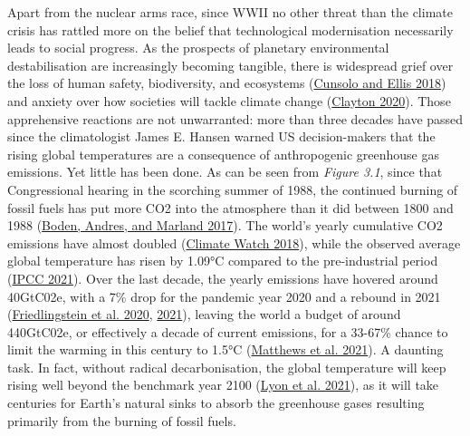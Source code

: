 \documentclass[a4paper, nobind]{templates/ociamthesis}
\begin{document}
Apart from the nuclear arms race, since WWII no other threat than the climate crisis has rattled more on the belief that technological modernisation necessarily leads to social progress. As the prospects of planetary environmental destabilisation are increasingly becoming tangible, there is widespread grief over the loss of human safety, biodiversity, and ecosystems (\protect\hyperlink{ref-cunsolo_ecological_2018}{Cunsolo and Ellis 2018}) and anxiety over how societies will tackle climate change (\protect\hyperlink{ref-clayton_climate_2020}{Clayton 2020}). Those apprehensive reactions are not unwarranted: more than three decades have passed since the climatologist James E. Hansen warned US decision-makers that the rising global temperatures are a consequence of anthropogenic greenhouse gas emissions. Yet little has been done. As can be seen from \emph{Figure 3.1}, since that Congressional hearing in the scorching summer of 1988, the continued burning of fossil fuels has put more CO2 into the atmosphere than it did between 1800 and 1988 (\protect\hyperlink{ref-boden_global_2017}{Boden, Andres, and Marland 2017}). The world's yearly cumulative CO2 emissions have almost doubled (\protect\hyperlink{ref-climate_watch_historical_2018}{Climate Watch 2018}), while the observed average global temperature has risen by 1.09°C compared to the pre-industrial period (\protect\hyperlink{ref-ipcc_summary_2021}{IPCC 2021}). Over the last decade, the yearly emissions have hovered around 40GtC02e, with a 7\% drop for the pandemic year 2020 and a rebound in 2021 (\protect\hyperlink{ref-friedlingstein_global_2020}{Friedlingstein et al. 2020}, \protect\hyperlink{ref-friedlingstein_global_2021}{2021}), leaving the world a budget of around 440GtC02e, or effectively a decade of current emissions, for a 33-67\% chance to limit the warming in this century to 1.5°C (\protect\hyperlink{ref-matthews_integrated_2021}{Matthews et al. 2021}). A daunting task. In fact, without radical decarbonisation, the global temperature will keep rising well beyond the benchmark year 2100 (\protect\hyperlink{ref-lyon_climate_2021}{Lyon et al. 2021}), as it will take centuries for Earth's natural sinks to absorb the greenhouse gases resulting primarily from the burning of fossil fuels.
\end{document}
